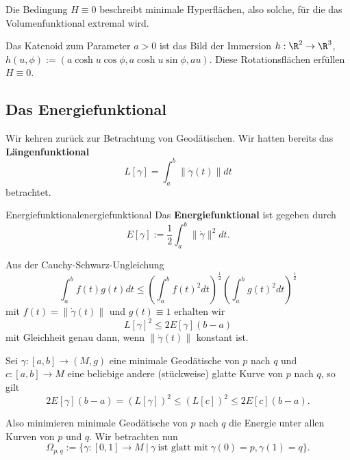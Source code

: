 \begin{bemerkung}
Die Bedingung $H \equiv 0$ beschreibt minimale Hyperflächen, also solche, für die das Volumenfunktional extremal wird.
\end{bemerkung}
\begin{beispiel}
Das Katenoid zum Parameter $a>0$ ist das Bild der Immersion $h: \R^2 \to \R^3$, $h(u,\phi):=(a \cosh u \cos \phi, a \cosh u \sin \phi, au)$. Diese Rotationsflächen erfüllen $H \equiv 0$.
\end{beispiel}
\subsection{Das Energiefunktional}
\label{energiefunk}
Wir kehren zurück zur Betrachtung von Geodätischen. Wir hatten bereits das \textbf{Längenfunktional}
\begin{equation}
L[\gamma] = \int_a^b \| \dot{\gamma}(t) \| dt
\end{equation} 
betrachtet.
\begin{definition}{Energiefunktional}{energiefunktional}
Das \textbf{Energiefunktional} ist gegeben durch
\begin{equation}
E[\gamma]:= \frac{1}{2} \int_a^b \| \dot{\gamma} \|^2 dt.
\end{equation}
\end{definition}
Aus der Cauchy-Schwarz-Ungleichung
\begin{equation}
\int_a^b f(t)g(t)dt \leq \left( \int_a^b f(t)^2 dt \right)^\frac{1}{2} \left( \int_a^b g(t)^2 dt \right)^\frac{1}{2}
\end{equation}
mit $f(t)=\| \dot{\gamma}(t)\|$ und $g(t)\equiv 1$ erhalten wir
\begin{equation}
L[\gamma]^2 \leq 2 E [\gamma](b-a)
\end{equation}
mit Gleichheit genau dann, wenn $\| \dot{\gamma}(t) \|$ konstant ist.
\begin{satz}{}{}
Sei $\gamma: [a,b] \to (M,g)$ eine minimale Geodätische von $p$ nach $q$ und $c: [a,b] \to M$ eine beliebige andere (stückweise) glatte Kurve von $p$ nach $q$, so gilt
\begin{equation}
2 E[\gamma](b-a) = (L[\gamma])^2 \leq (L[c])^2 \leq 2 E[c](b-a).
\end{equation}
\end{satz}
Also minimieren minimale Geodätische von $p$ nach $q$ die Energie unter allen Kurven von $p$ und $q$. Wir betrachten nun
\begin{equation}
\Omega_{p,q} := \{ \gamma:[0,1] \to M \ | \ \gamma \ \text{ist glatt mit} \ \gamma(0)=p, \gamma(1)=q \}.
\end{equation}
